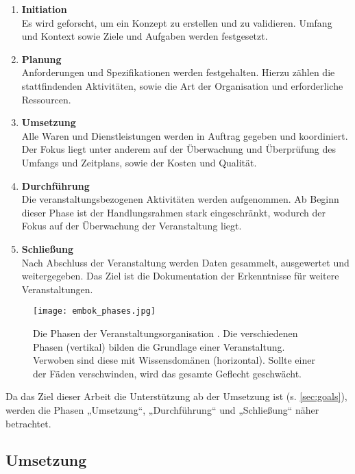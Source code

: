 \begin{enumerate}
    \setlength{\itemsep}{1em}
    \item \textbf{Initiation} \\
          Es wird geforscht, um ein Konzept zu erstellen und zu validieren.
          Umfang und Kontext sowie Ziele und Aufgaben werden festgesetzt.
    \item \textbf{Planung} \\
          Anforderungen und Spezifikationen werden festgehalten. Hierzu zählen
          die stattfindenden Aktivitäten, sowie die Art der Organisation und
          erforderliche Ressourcen.
    \item \textbf{Umsetzung} \\
          Alle Waren und Dienstleistungen werden in Auftrag gegeben und
          koordiniert. Der Fokus liegt unter anderem auf der Überwachung und
          Überprüfung des Umfangs und Zeitplans, sowie der Kosten und Qualität.
    \item \textbf{Durchführung} \\
          Die veranstaltungsbezogenen Aktivitäten werden aufgenommen. Ab Beginn
          dieser Phase ist der Handlungsrahmen stark eingeschränkt, wodurch der
          Fokus auf der Überwachung der Veranstaltung liegt.
    \item \textbf{Schließung} \\
          Nach Abschluss der Veranstaltung werden Daten gesammelt, ausgewertet
          und weitergegeben. Das Ziel ist die Dokumentation der Erkenntnisse für
          weitere Veranstaltungen.
\end{enumerate}

\begin{figure}[htpb]
    \centering
    \texttt{[image: embok\_phases.jpg]}
    \caption{Die Phasen der Veranstaltungsorganisation \cite{Silvers2013b}. Die
        verschiedenen Phasen (vertikal) bilden die Grundlage einer
        Veranstaltung. Verwoben sind diese mit Wissensdomänen (horizontal).
        Sollte einer der Fäden verschwinden, wird das gesamte Geflecht
        geschwächt.}
    \label{fig:embok-phases}
\end{figure}

Da das Ziel dieser Arbeit die Unterstützung ab der Umsetzung ist (s.
\autoref{sec:goals}), werden die Phasen „Umsetzung“, „Durchführung“ und
„Schließung“ näher betrachtet.

\subsection{Umsetzung} \label{sec:analysis-org-umsetzung}

